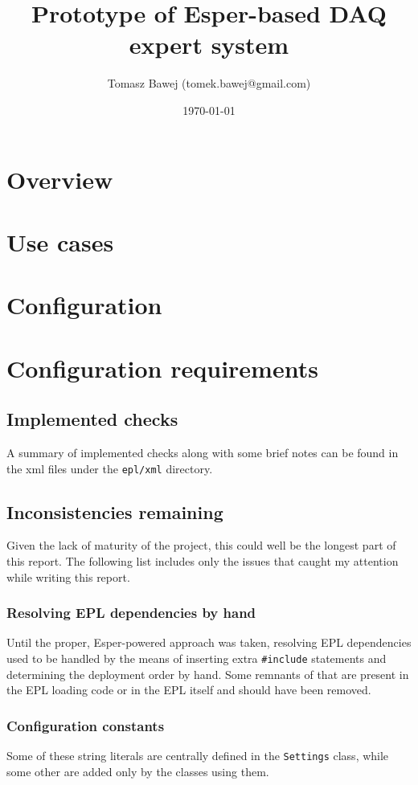 \documentclass[11pt,oneside,a4paper]{article}
\title{Prototype of Esper-based DAQ expert system}
\date{\today}
\author{Tomasz Bawej (tomek.bawej@gmail.com)}
\begin{document}
\maketitle

\tableofcontents
\clearpage

\section{Overview}


\section{Use cases}\label{sec:usage}


\section{Configuration}\label{sec:config}


\section{Configuration requirements}



\subsection{Implemented checks}
A summary of implemented checks along with some brief notes can be found in the xml files under the \texttt{epl/xml} directory.

%

\subsection{Inconsistencies remaining}

Given the lack of maturity of the project, this could well be the longest part of this report. The following list includes only the issues that caught my attention while writing this report.

\subsubsection{Resolving EPL dependencies by hand}
Until the proper, Esper-powered approach was taken, resolving EPL dependencies used to be handled by the means of inserting extra \texttt{\#include} statements and determining the deployment order by hand.
Some remnants of that are present in the EPL loading code or in the EPL itself and should have been removed.

\subsubsection{Configuration constants}
Some of these string literals are centrally defined in the \texttt{Settings} class, while some other are added only by the classes using them. 
\end{document}
